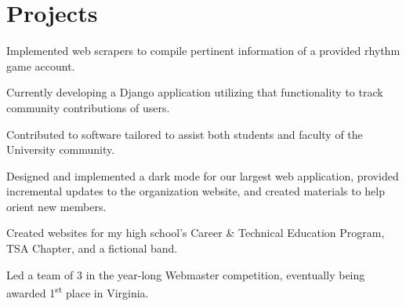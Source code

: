 \documentclass[]{deedy-resume-openfont}
\begin{document}
\section{Projects}
\begin{tightemize}
\item Implemented web scrapers to compile pertinent information of a provided rhythm game account. 
\item Currently developing a Django application utilizing that functionality to track community contributions of users.
\end{tightemize}
\sectionsep

\begin{tightemize}
\item Contributed to software tailored to assist both students and faculty of the University community.
\item Designed and implemented a dark mode for our largest web application, provided incremental updates to the organization website, and created materials to help orient new members.
\end{tightemize}
\sectionsep

\begin{tightemize}
\item Created websites for my high school’s Career \& Technical Education Program,  TSA Chapter, and a fictional band.
\item Led a team of 3 in the year-long Webmaster competition, eventually being awarded 1\textsuperscript{st} place in Virginia.
\end{tightemize}
\end{document}
